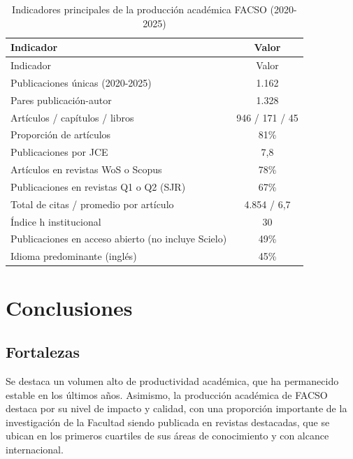 \documentclass[
  spanish,
  a4paper,
  oneside]{scrbook}
\begin{document}

\begin{longtable}[]{@{}lc@{}}
\caption{Indicadores principales de la producción académica FACSO
(2020-2025)}\label{tbl-sintesis}\tabularnewline
\toprule\noalign{}
Indicador & Valor \\
\midrule\noalign{}
\endfirsthead
\toprule\noalign{}
Indicador & Valor \\
\midrule\noalign{}
\endhead
\bottomrule\noalign{}
\endlastfoot
Publicaciones únicas (2020-2025) & 1.162 \\
Pares publicación-autor & 1.328 \\
Artículos / capítulos / libros & 946 / 171 / 45 \\
Proporción de artículos & 81\% \\
Publicaciones por JCE & 7,8 \\
Artículos en revistas WoS o Scopus & 78\% \\
Publicaciones en revistas Q1 o Q2 (SJR) & 67\% \\
Total de citas / promedio por artículo & 4.854 / 6,7 \\
Índice h institucional & 30 \\
Publicaciones en acceso abierto (no incluye Scielo) & 49\% \\
Idioma predominante (inglés) & 45\% \\
\end{longtable}

\section*{Conclusiones}\label{conclusiones}


\subsection*{Fortalezas}\label{fortalezas}

Se destaca un volumen alto de productividad académica, que ha
permanecido estable en los últimos años. Asimismo, la producción
académica de FACSO destaca por su nivel de impacto y calidad, con una
proporción importante de la investigación de la Facultad siendo
publicada en revistas destacadas, que se ubican en los primeros
cuartiles de sus áreas de conocimiento y con alcance internacional.
\end{document}
